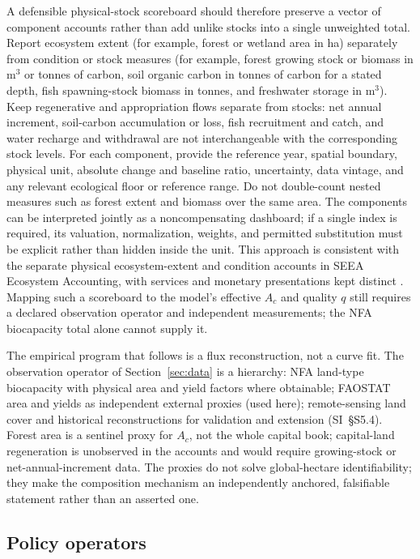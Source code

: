 A defensible physical-stock scoreboard should therefore preserve a vector of component accounts rather than add unlike stocks into a single unweighted total. Report ecosystem extent (for example, forest or wetland area in ha) separately from condition or stock measures (for example, forest growing stock or biomass in m$^3$ or tonnes of carbon, soil organic carbon in tonnes of carbon for a stated depth, fish spawning-stock biomass in tonnes, and freshwater storage in m$^3$). Keep regenerative and appropriation flows separate from stocks: net annual increment, soil-carbon accumulation or loss, fish recruitment and catch, and water recharge and withdrawal are not interchangeable with the corresponding stock levels. For each component, provide the reference year, spatial boundary, physical unit, absolute change and baseline ratio, uncertainty, data vintage, and any relevant ecological floor or reference range. Do not double-count nested measures such as forest extent and biomass over the same area. The components can be interpreted jointly as a noncompensating dashboard; if a single index is required, its valuation, normalization, weights, and permitted substitution must be explicit rather than hidden inside the unit. This approach is consistent with the separate physical ecosystem-extent and condition accounts in SEEA Ecosystem Accounting, with services and monetary presentations kept distinct \citep{UN2021SEEA_EA}. Mapping such a scoreboard to the model's effective $A_c$ and quality $q$ still requires a declared observation operator and independent measurements; the NFA biocapacity total alone cannot supply it.

The empirical program that follows is a flux reconstruction, not a curve fit. The observation operator of Section~\ref{sec:data} is a hierarchy: NFA land-type biocapacity with physical area and yield factors where obtainable; FAOSTAT area and yields as independent external proxies (used here); remote-sensing land cover and historical reconstructions for validation and extension (SI~\S S5.4). Forest area is a sentinel proxy for $A_c$, not the whole capital book; capital-land regeneration is unobserved in the accounts and would require growing-stock or net-annual-increment data. The proxies do not solve global-hectare identifiability; they make the composition mechanism an independently anchored, falsifiable statement rather than an asserted one.

\subsection{Policy operators}

